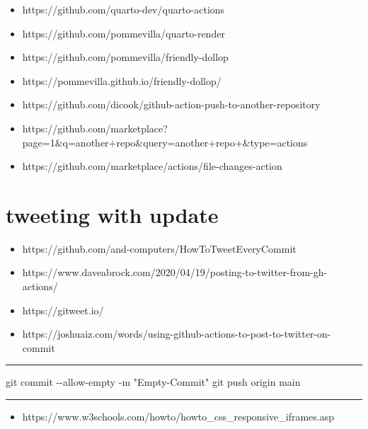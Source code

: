 \documentclass[
  letterpaper,
  DIV=11,
  numbers=noendperiod]{scrreprt}
\newenvironment{Shaded}{}{}
\newcommand{\AttributeTok}[1]{\textcolor[rgb]{0.49,0.56,0.16}{#1}}
\newcommand{\FunctionTok}[1]{\textcolor[rgb]{0.02,0.16,0.49}{#1}}
\newcommand{\NormalTok}[1]{#1}
\newcommand{\StringTok}[1]{\textcolor[rgb]{0.25,0.44,0.63}{#1}}
\providecommand{\tightlist}{%
  \setlength{\itemsep}{0pt}\setlength{\parskip}{0pt}}\usepackage{longtable,booktabs,array}
\begin{document}
\begin{itemize}
\tightlist
\item
  https://github.com/quarto-dev/quarto-actions
\item
  https://github.com/pommevilla/quarto-render
\item
  https://github.com/pommevilla/friendly-dollop
\item
  https://pommevilla.github.io/friendly-dollop/
\item
  https://github.com/dicook/github-action-push-to-another-repository
\item
  https://github.com/marketplace?page=1\&q=another+repo\&query=another+repo+\&type=actions
\item
  https://github.com/marketplace/actions/file-changes-action
\end{itemize}

\hypertarget{tweeting-with-update}{%
\section{tweeting with update}\label{tweeting-with-update}}

\begin{itemize}
\tightlist
\item
  https://github.com/and-computers/HowToTweetEveryCommit
\item
  https://www.daveabrock.com/2020/04/19/posting-to-twitter-from-gh-actions/
\item
  https://gitweet.io/
\item
  https://joshuaiz.com/words/using-github-actions-to-post-to-twitter-on-commit
\end{itemize}

\begin{center}\rule{0.5\linewidth}{0.5pt}\end{center}

\begin{Shaded}
\begin{Highlighting}[]
\FunctionTok{git}\NormalTok{ commit }\AttributeTok{{-}{-}allow{-}empty} \AttributeTok{{-}m} \StringTok{"Empty{-}Commit"}
\FunctionTok{git}\NormalTok{ push origin main}
\end{Highlighting}
\end{Shaded}

\begin{center}\rule{0.5\linewidth}{0.5pt}\end{center}

\begin{itemize}
\tightlist
\item
  https://www.w3schools.com/howto/howto\_css\_responsive\_iframes.asp
\end{itemize}
\end{document}
